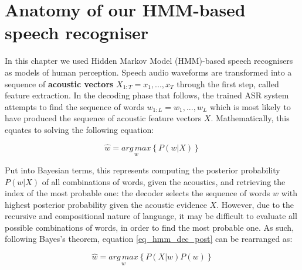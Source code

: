 








\section{Anatomy of our HMM-based speech recogniser}
In this chapter we used Hidden Markov Model (HMM)-based speech recognisers as models of human perception. 
Speech audio waveforms are transformed into a sequence of \textbf{acoustic vectors} $X_{1:T} = x_{1}, ..., x_{T}$ through the first step, called feature extraction. In the decoding phase that follows, the trained ASR system attempts to find the sequence of words $w_{1:L} = w_{1}, ..., w_{L}$ which is most likely to have produced the sequence of acoustic feature vectors $X$.
Mathematically, this equates to solving the following equation:

\begin{equation}
  \widehat{w} = \underset{w}{arg\,max} \left \{  P(w|X)\right \}
  \label{eq_hmm_dec_post}
\end{equation}

Put into Bayesian terms, this represents computing the posterior probability $P(w|X)$ of all combinations of words, given the acoustics, and retrieving the index of the most probable one: the decoder selects the sequence of words $w$ with highest posterior probability given the acoustic evidence $X$. However, due to the recursive and compositional nature of language, it may be difficult to evaluate all possible combinations of words, in order to find the most probable one. As such, following Bayes's theorem, equation \ref{eq_hmm_dec_post} can be rearranged as:

\begin{equation}
  \widehat{w} = \underset{w}{arg\,max} \left \{  P(X|w)P(w)\right \}
  \label{eq_hmm_dec_post}
\end{equation}

